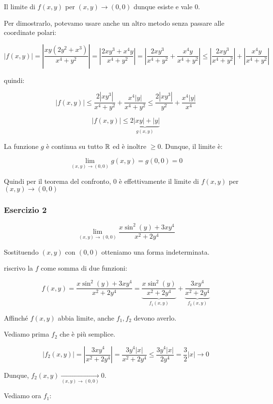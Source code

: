 Il limite di \(f(x,y)\) per \((x,y) \to (0,0)\) dunque esiste e vale \(0\).

Per dimostrarlo, potevamo usare anche un altro metodo senza passare alle coordinate polari:

\[
    \left|f(x,y)\right| = \left|\frac{xy(2y^{2}+x^{3})}{x^{4}+y^{2}}\right| = \left|\frac{2xy^{3}+x^{4}y}{x^{4}+y^{2}}\right| = \left| \frac{2xy^{3}}{x^{4}+y^{2}}+ \frac{x^{4}y}{x^{4}+y^{2}}\right| \le \left|\frac{2xy^{3}}{x^{4}+y^{2}}\right|+ \left|\frac{x^{4}y}{x^{4}+y^{2}}\right|
\]

quindi:

\[
    |f(x,y)| \le \frac{2|xy^{3}|}{x^{4}+y^{2}} + \frac{x^{4}|y|}{x^{4}+y^{2}} \le \frac{2|xy^{3}|}{y^{2}} + \frac{x^{4}|y|}{x^{4}}
\]

\[
    |f(x,y)| \le \underbrace{2 |xy| + |y|}_{g(x,y)}
\]

La funzione \(g\) è continua su tutto \(\mathbb{R} \) ed è inoltre \(\ge 0\). Dunque, il limite è:

\[
    \lim_{ (x,y) \to (0,0) } g(x,y) = g(0,0) = 0
\]

Quindi per il teorema del confronto, 0 è effettivamente il limite di \(f(x,y)\) per \((x,y) \to (0,0)\)

\filbreak{}
\subsubsection*{Esercizio 2}

\[
    \lim_{ (x,y) \to (0,0) } \frac{x\sin^{2}(y)+ 3xy^{4}}{x^{2}+2y^{4}}
\]

Sostituendo \((x,y)\) con \((0,0)\) otteniamo una forma indeterminata.

riscrivo la \(f\) come somma di due funzioni:

\[
    f(x,y) = \frac{x\sin^{2}(y)+ 3xy^{4}}{x^{2}+2y^{4}}  = \underbrace{\frac{x\sin^{2}(y)}{x^{2}+2y^{4}}}_{f_1(x,y)} + \underbrace{\frac{3xy^{4}}{x^{2}+2y^{4}}}_{f_2(x,y)}
\]

Affinché \(f(x,y)\) abbia limite, anche \(f_1, f_2\) devono averlo.

Vediamo prima \(f_2\) che è più semplice.

\[
    |f_2(x,y)| = \left| \frac{3xy^{4}}{x^{2}+2y^{4}}\right| =\frac{3y^{4}|x|}{x^{2}+2y^{4}} \le \frac{3y^{4}|x|}{2y^{4}} = \frac{3}{2}|x| \rightarrow 0
\]

Dunque, \(f_2(x,y) \xrightarrow[(x,y) \to (0,0)]{} 0\).

Vediamo ora \(f_1\):

